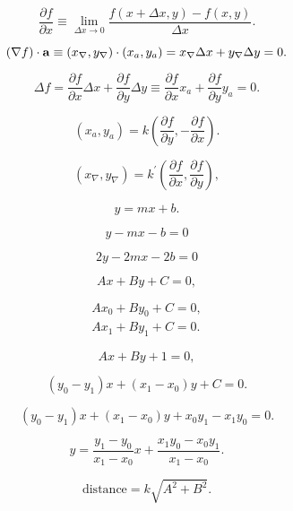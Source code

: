 \documentclass[lang=cn,12pt,marginpar=margintrue]{elegantbook}
\begin{document}
\[
  {\frac{\partial f}{\partial x}}\equiv\operatorname*{lim}_{\Delta x\to0}{\frac{f(x+\Delta x,y)-f(x,y)}{\Delta x}}.
\]

\begin{equation}
  (\nabla f)\cdot{\bf a}\equiv(x_{\nabla},y_{\nabla})\cdot(x_{a},y_{a})=x_{\nabla}\Delta x+y_{\nabla}\Delta y=0.
\end{equation}

\[
  \Delta f={\frac{\partial f}{\partial x}}\Delta x+{\frac{\partial f}{\partial y}}\Delta y\equiv{\frac{\partial f}{\partial x}}x_{a}+{\frac{\partial f}{\partial y}}y_{a}=0.
\]

\begin{equation}
  (x_{a},y_{a})=k\left({\frac{\partial f}{\partial y}},-{\frac{\partial f}{\partial x}}\right).
\end{equation}

\[
  (x_{\nabla},y_{\nabla})=k^{\prime}\left({\frac{\partial f}{\partial x}},{\frac{\partial f}{\partial y}}\right),
\]

\begin{equation}
  y=mx+b.
\end{equation}

\begin{equation}
  y-mx-b=0
\end{equation}

\[
  2y-2mx-2b=0
\]

\begin{equation}
  Ax+By+C=0,
\end{equation}

\[
  \begin{array}{c}{{A x_{0}+B y_{0}+C=0,}}\\ {{A x_{1}+B y_{1}+C=0.}}\end{array}
\]

\[
  Ax+By+1=0,
\]

\begin{equation}
  (y_{0}-y_{1})x+(x_{1}-x_{0})y+C=0.
\end{equation}

\begin{equation}
  (y_{0}-y_{1})x+(x_{1}-x_{0})y+x_{0}y_{1}-x_{1}y_{0}=0.
\end{equation}

\[
  y={\frac{y_{1}-y_{0}}{x_{1}-x_{0}}}x+{\frac{x_{1}y_{0}-x_{0}y_{1}}{x_{1}-x_{0}}}.
\]

\begin{equation}
  \mathrm{distance}=k\sqrt{A^{2}+B^{2}}.
\end{equation}
\end{document}
